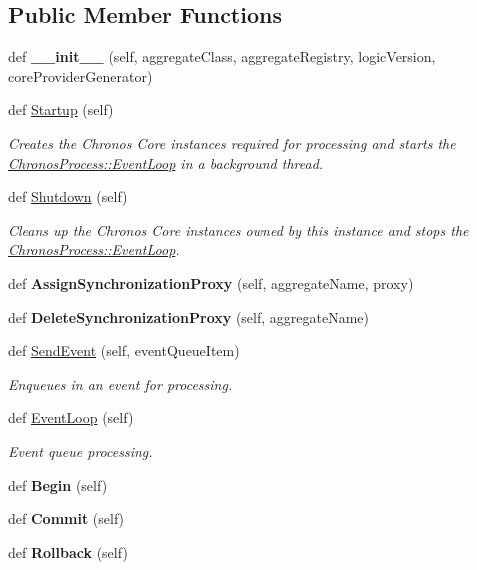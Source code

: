 \subsection*{Public Member Functions}
\begin{DoxyCompactItemize}
\item 
def {\bfseries \+\_\+\+\_\+init\+\_\+\+\_\+} (self, aggregate\+Class, aggregate\+Registry, logic\+Version, core\+Provider\+Generator)
\item 
def \hyperlink{group__Chronos_gae5027792d4f78b27d2b2eed69eeae697}{Startup} (self)
\begin{DoxyCompactList}\small\item\em Creates the Chronos Core instances required for processing and starts the \hyperlink{group__Chronos_gaefd9a9f928112951d36eb314ec1d1ef2}{Chronos\+Process\+::\+Event\+Loop} in a background thread. \end{DoxyCompactList}\item 
def \hyperlink{group__Chronos_gaf7218fb21583767ca7bda97becef62fd}{Shutdown} (self)
\begin{DoxyCompactList}\small\item\em Cleans up the Chronos Core instances owned by this instance and stops the \hyperlink{group__Chronos_gaefd9a9f928112951d36eb314ec1d1ef2}{Chronos\+Process\+::\+Event\+Loop}. \end{DoxyCompactList}\item 
def {\bfseries Assign\+Synchronization\+Proxy} (self, aggregate\+Name, proxy)
\item 
def {\bfseries Delete\+Synchronization\+Proxy} (self, aggregate\+Name)
\item 
def \hyperlink{group__Chronos_ga8b8d1338ffabd17cbf64eac8998b8f4b}{Send\+Event} (self, event\+Queue\+Item)
\begin{DoxyCompactList}\small\item\em Enqueues in an event for processing. \end{DoxyCompactList}\item 
def \hyperlink{group__Chronos_gaefd9a9f928112951d36eb314ec1d1ef2}{Event\+Loop} (self)
\begin{DoxyCompactList}\small\item\em Event queue processing. \end{DoxyCompactList}\item 
def {\bfseries Begin} (self)
\item 
def {\bfseries Commit} (self)
\item 
def {\bfseries Rollback} (self)

\end{DoxyCompactItemize}
